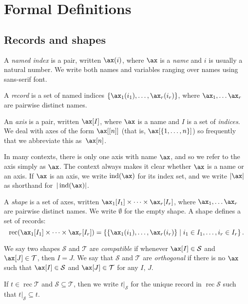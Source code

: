 \documentclass{article}
\DeclareMathOperator{\ind}{ind}
\DeclareMathOperator{\rec}{rec}
\newcommand{\restrict}[2]{\mathopen{}\left.#1\right|_{#2}}
\begin{document}
\section{Formal Definitions}
\label{sec:definitions}

\subsection{Records and shapes}

A \emph{named index} is a pair, written $\ax(i)$, where $\ax$ is a \emph{name} and $i$ is usually a natural number. We write both names and variables ranging over names using sans-serif font.

A \emph{record} is a set of named indices $\{\ax_1(i_1), \ldots, \ax_r(i_r)\}$, where $\ax_1, \ldots \ax_r$ are pairwise distinct names. 

An \emph{axis} is a pair, written $\ax[I]$, where $\ax$ is a name and $I$ is a set of \emph{indices}.
We deal with axes of the form $\ax[[n]]$ (that is, $\ax[\{1, \ldots, n\}]$) so frequently that we abbreviate this as~$\ax[n]$.

In many contexts, there is only one axis with name $\ax$, and so we refer to the axis simply as $\ax$. The context always makes it clear whether $\ax$ is a name or an axis. If $\ax$ is an axis, we write $\ind(\ax)$ for its index set, and we write $|\ax|$ as shorthand for~$|\ind(\ax)|$.

A \emph{shape} is a set of axes, written $\ax_1[I_1] \times \cdots \times \ax_r[I_r]$, where $\ax_1, \ldots \ax_r$ are pairwise distinct names. We write $\emptyset$ for the empty shape. A shape defines a set of records:
\begin{equation*}
\rec (\ax_1[I_1] \times \cdots \times \ax_r[I_r]) = \left\{\{\ax_1(i_1), \ldots, \ax_r(i_r)\} \mid i_1 \in I_1, \ldots, i_r \in I_r\right\}.
\end{equation*}

We say two shapes $\mathcal{S}$ and $\mathcal{T}$ are \emph{compatible} if whenever $\ax[I] \in \mathcal{S}$ and $\ax[J] \in \mathcal{T}$, then $I = J$. We say that $\mathcal{S}$ and $\mathcal{T}$ are \emph{orthogonal} if there is no $\ax$ such that $\ax[I] \in \mathcal{S}$ and $\ax[J] \in \mathcal{T}$ for any $I$, $J$.

If $t \in \rec \mathcal{T}$ and $\mathcal{S} \subseteq \mathcal{T}$, then we write $\restrict{t}{\mathcal{S}}$ for the unique record in $\rec \mathcal{S}$ such that $\restrict{t}{\mathcal{S}} \subseteq t$.
\end{document}
